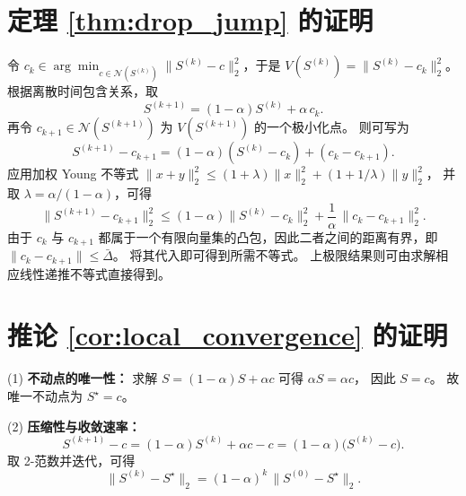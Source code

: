 \documentclass[journal]{IEEEtran}
\theoremstyle{plain}
\theoremstyle{definition}
\begin{document}
\section{定理 \ref{thm:drop_jump} 的证明}
\label{app:proof_thm_drop_jump}
\begin{IEEEproof}
令 $c_k\in\arg\min_{c\in\mathcal N(S^{(k)})}\|S^{(k)}-c\|_2^2$，于是
$V(S^{(k)})=\|S^{(k)}-c_k\|_2^2$。
根据离散时间包含关系，取
\begin{equation}
S^{(k+1)}=(1-\alpha)S^{(k)}+\alpha\,c_k.
\end{equation}
再令 $c_{k+1}\in\mathcal N(S^{(k+1)})$ 为 $V(S^{(k+1)})$ 的一个极小化点。
则可写为
\begin{equation}
S^{(k+1)}-c_{k+1}=(1-\alpha)(S^{(k)}-c_k) + (c_k-c_{k+1}).
\end{equation}
应用加权 Young 不等式
$\|x+y\|_2^2\le (1+\lambda)\|x\|_2^2+(1+1/\lambda)\|y\|_2^2$，
并取 $\lambda=\alpha/(1-\alpha)$，可得
\begin{equation}
\|S^{(k+1)}-c_{k+1}\|_2^2 \le (1-\alpha)\|S^{(k)}-c_k\|_2^2 + \frac{1}{\alpha}\,\|c_k-c_{k+1}\|_2^2.
\end{equation}
由于 $c_k$ 与 $c_{k+1}$ 都属于一个有限向量集的凸包，因此二者之间的距离有界，即
$\|c_k-c_{k+1}\|\le \bar\Delta$。
将其代入即可得到所需不等式。
上极限结果则可由求解相应线性递推不等式直接得到。
\end{IEEEproof}

\section{推论 \ref{cor:local_convergence} 的证明}
\label{app:proof_cor_local_convergence}
\begin{IEEEproof}
(1) \textbf{不动点的唯一性：}
求解
$S=(1-\alpha)S+\alpha c$
可得
$\alpha S=\alpha c$，
因此 $S=c$。
故唯一不动点为 $S^\star=c$。

(2) \textbf{压缩性与收敛速率：}
\begin{equation}
S^{(k+1)}-c = (1-\alpha)S^{(k)}+\alpha c-c = (1-\alpha)\big(S^{(k)}-c\big).
\end{equation}
取 2-范数并迭代，可得
\begin{equation}
\|S^{(k)}-S^\star\|_2 = (1-\alpha)^k\,\|S^{(0)}-S^\star\|_2.
\end{equation}
\end{IEEEproof}
\end{document}
